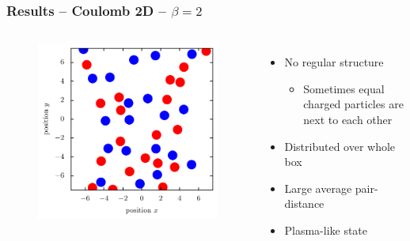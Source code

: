 \documentclass[mathserif,serif]{beamer}
\begin{document}
\begin{frame}
	\frametitle{Results -- Coulomb 2D -- $\beta=2$}
	\centering
	\begin{columns}	
	\begin{figure}
	\includegraphics[width=\textwidth]{../report/figures/Plasma_1_beta_2.pdf}
	\end{figure}
	\begin{itemize}
	\item No regular structure
	\begin{itemize}
		\item Sometimes equal charged particles are next to each other
	\end{itemize}
	\item Distributed over whole box
	\item Large average pair-distance
	\item Plasma-like state
	\end{itemize}
\end{columns}
\end{frame}
\end{document}
